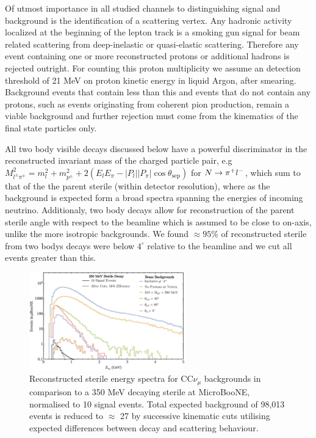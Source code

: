 \documentclass[11pt, a4paper]{article}
\def\muboone{MicroBooNE}
\def\ster{\ensuremath N}
\begin{document}
Of utmost importance in all studied channels to distinguishing signal and
background is the identification of a scattering vertex. Any hadronic activity
localized at the beginning of the lepton track is a smoking gun signal for beam
related scattering from deep-inelastic or quasi-elastic scattering. Therefore
any event containing one or more reconstructed protons or additional hadrons is
rejected outright. For counting this proton multiplicity we assume an detection
threshold of 21 MeV on proton kinetic energy in liquid Argon, after smearing.
Background events that contain less than this and events that do not contain
any protons, such as events originating from coherent pion production, remain a
viable background and further rejection must come from the kinematics of the
final state particles only. 

All two body visible decays discussed below have a powerful discriminator in
the reconstructed invariant mass of the charged particle pair, e.g  $M_{l^\pm
\pi^\mp}^2=m_l^2+m_{p^\pm}^2+ 2(E_l E_\pi - |P_l||P_\pi|\cos\theta_\text{sep})$
for $\ster\rightarrow \pi^+ l^-$, which sum to that of the the parent sterile
(within detector resolution), where as the background is expected form a broad
spectra spanning the energies of incoming neutrino. Additionaly, two body
decays allow for reconstruction of the parent sterile angle with respect to the
beamline which is assumed to be close to on-axis, unlike the more isotropic
backgrounds. We found $\approx 95$\% of reconstructed sterile from two bodys
decays were below $4^\circ$ relative to the beamline and we cut all events
greater than this.

\begin{figure}[h]
\center
\includegraphics[width=0.6\textwidth,clip,trim=0 0 0 0]{figures/mu_pi_cutflow.pdf}

\caption{\label{fig:mu_pi_cutflow} Reconstructed sterile energy spectra for
CC$\nu_\mu$ backgrounds in comparison to a 350 MeV decaying sterile at
\muboone, normalised to 10 signal events. Total expected background of 98,013
events is reduced to $\approx$ 27 by successive kinematic cuts utilising
expected differences between decay and scattering behaviour. }

\end{figure}
\end{document}
